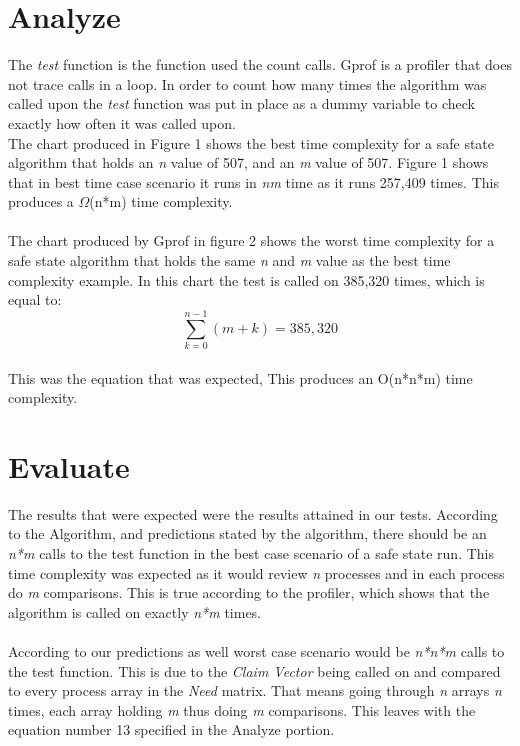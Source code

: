 \documentclass[letterpaper,oneside,10pt]{article}
\begin{document}
\begin{left}
\begin{left}
\begin{left}
\begin{left}
\section{Analyze}
The \textit{test} function is the function used the count calls. Gprof is a profiler that does not trace calls in a loop. In order to count how many times the algorithm was called upon the \textit{test} function was put in place as a dummy variable to check exactly how often it was called upon. 
\\
The chart produced in Figure 1 shows the best time complexity for a safe state algorithm that holds an \textit{n} value of 507, and an \textit{m} value of 507. Figure 1 shows that in best time case scenario it runs in \textit{nm} time as it runs 257,409 times. This produces a \( \Omega \)(n*m) time complexity.\\
\\
The chart produced by Gprof in figure 2 shows the worst time complexity for a safe state algorithm that holds the same \textit{n} and \textit{m} value as the best time complexity example. In this chart the test is called on 385,320 times, which is equal to:
\begin{equation}
\sum_{k=0}^{n-1} (m+k) = 385,320
\end{equation}
\\
This was the equation that was expected, This produces an O(n*n*m) time complexity. 
\section{Evaluate}
The results that were expected were the results attained in our tests. According to the Algorithm, and predictions stated by the algorithm, there should be an \textit{n*m} calls to the test function in the best case scenario of a safe state run. This time complexity was expected as it would review \textit{n} processes and in each process do \textit{m} comparisons.  This is true according to the profiler, which shows that the algorithm is called on exactly \textit{n*m} times.\\
\\
According to our predictions as well worst case scenario would be \textit{n*n*m} calls to the test function. This is due to the \textit{Claim Vector} being called on and compared to every process array in the \textit{Need} matrix. That means going through \textit{n} arrays \textit{n} times, each array holding \textit{m} thus doing \textit{m} comparisons. This leaves with the equation number 13 specified in the Analyze portion. 

\end{left}
\end{left}
\end{left}
\end{left}
\end{document}
